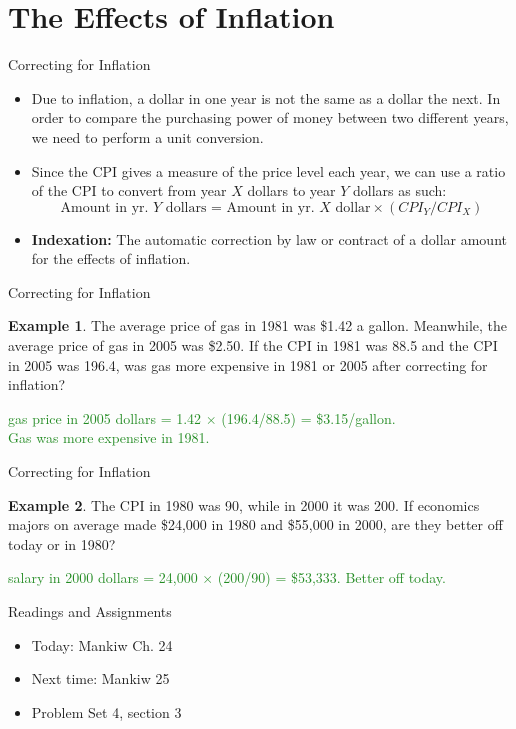\documentclass[xcolor={dvipsnames},pdf, hyperref={colorlinks=true, citecolor=ForestGreen, linkcolor=BlueViolet, urlcolor=Magenta}]{beamer}
\theoremstyle{definition}
\newtheorem{exmp}{Example}[section]
\newcommand{\defn}[1]{\textbf{#1}}
\newcommand{\ddp}[1]{{\textcolor{ForestGreen}{#1}}}
\begin{document}
\section{The Effects of Inflation}

\begin{frame}{Correcting for Inflation}
\begin{itemize}
	\item Due to inflation, a dollar in one year is not the same as a dollar the next. In order to compare the purchasing power of money between two different years, we need to perform a unit conversion. 
	\item Since the CPI gives a measure of the price level each year, we can use a ratio of the CPI to convert from year $X$ dollars to year $Y$ dollars as such:
	\[\text{Amount in yr. $Y$ dollars = Amount in yr. $X$ dollar} \times (CPI_Y/CPI_X)\]
	\item \defn{Indexation:} The automatic correction by law or contract of a dollar amount for the effects of inflation.
\end{itemize}
\end{frame}


\begin{frame}{Correcting for Inflation}
\begin{exmp} The average price of gas in 1981 was \$1.42 a gallon. Meanwhile, the average price of gas in 2005 was \$2.50. If the CPI in 1981 was 88.5 and the CPI in 2005 was 196.4, was gas more expensive in 1981 or 2005 after correcting for inflation? 
\end{exmp}
\ddp{ gas price in 2005 dollars = 1.42 $\times$ (196.4/88.5) = \$3.15/gallon. \\ Gas was more expensive in 1981.}
\end{frame}

\begin{frame}{Correcting for Inflation}
\begin{exmp}
	The CPI in 1980 was 90, while in 2000 it was 200. If economics majors on average made \$24,000 in 1980 and \$55,000 in 2000, are they better off today or in 1980?
\end{exmp}

\ddp{ salary in 2000 dollars = 24,000 $\times$ (200/90) = \$53,333. Better off today.}
\end{frame}


\begin{frame}{Readings and Assignments}
\begin{itemize}
	\item Today: Mankiw Ch. 24
	\item Next time: Mankiw 25
	\item Problem Set 4, section 3
\end{itemize}
\end{frame}
\end{document}
